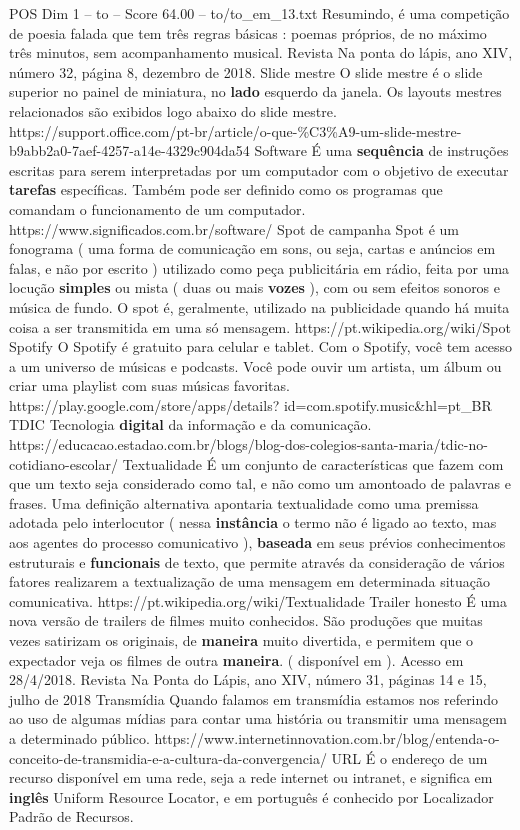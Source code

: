 \begin{textsample}{POS Dim 1 – to – Score 64.00 – to/to\_em\_13.txt}
Resumindo, é uma competição de poesia falada que tem três regras básicas : poemas próprios, de no máximo três minutos, sem acompanhamento musical.
Revista Na ponta do lápis, ano XIV, número 32, página 8, dezembro de 2018.
Slide mestre O slide mestre é o slide superior no painel de miniatura, no \textbf{lado} esquerdo da janela.
Os layouts mestres relacionados são exibidos logo abaixo do slide mestre. https://support.office.com/pt-br/article/o-que-\%C3\%A9-um-slide-mestre-b9abb2a0-7aef-4257-a14e-4329c904da54 Software É uma \textbf{sequência} de instruções escritas para serem interpretadas por um computador com o objetivo de executar \textbf{tarefas} específicas.
Também pode ser definido como os programas que comandam o funcionamento de um computador. https://www.significados.com.br/software/ Spot de campanha Spot é um fonograma ( uma forma de comunicação em sons, ou seja, cartas e anúncios em falas, e não por escrito ) utilizado como peça publicitária em rádio, feita por uma locução \textbf{simples} ou mista ( duas ou mais \textbf{vozes} ), com ou sem efeitos sonoros e música de fundo.
O spot é, geralmente, utilizado na publicidade quando há muita coisa a ser transmitida em uma só mensagem. https://pt.wikipedia.org/wiki/Spot Spotify O Spotify é gratuito para celular e tablet.
Com o Spotify, você tem acesso a um universo de músicas e podcasts.
Você pode ouvir um artista, um álbum ou criar uma playlist com suas músicas favoritas. https://play.google.com/store/apps/details? id=com.spotify.music\&hl=pt\_BR TDIC Tecnologia \textbf{digital} da informação e da comunicação. https://educacao.estadao.com.br/blogs/blog-dos-colegios-santa-maria/tdic-no-cotidiano-escolar/ Textualidade É um conjunto de características que fazem com que um texto seja considerado como tal, e não como um amontoado de palavras e frases.
Uma definição alternativa apontaria textualidade como uma premissa adotada pelo interlocutor ( nessa \textbf{instância} o termo não é ligado ao texto, mas aos agentes do processo comunicativo ), \textbf{baseada} em seus prévios conhecimentos estruturais e \textbf{funcionais} de texto, que permite através da consideração de vários fatores realizarem a textualização de uma mensagem em determinada situação comunicativa. https://pt.wikipedia.org/wiki/Textualidade Trailer honesto É uma nova versão de trailers de filmes muito conhecidos.
São produções que muitas vezes satirizam os originais, de \textbf{maneira} muito divertida, e permitem que o expectador veja os filmes de outra \textbf{maneira}. ( disponível em ).
Acesso em 28/4/2018.
Revista Na Ponta do Lápis, ano XIV, número 31, páginas 14 e 15, julho de 2018 Transmídia Quando falamos em transmídia estamos nos referindo ao uso de algumas mídias para contar uma história ou transmitir uma mensagem a determinado público. https://www.internetinnovation.com.br/blog/entenda-o-conceito-de-transmidia-e-a-cultura-da-convergencia/ URL É o endereço de um recurso disponível em uma rede, seja a rede internet ou intranet, e significa em \textbf{inglês} Uniform Resource Locator, e em português é conhecido por Localizador Padrão de Recursos.

\end{textsample}
